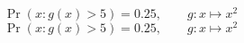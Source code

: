 \documentclass[nofonts]{ctexart}
\begin{document}
\[
	\Pr(x \colon g(x)>5) = 0.25,
	\qquad g \colon x \mapsto x^2
\]
\[
	\Pr(x : g(x)>5) = 0.25,
	\qquad g : x \mapsto x^2
\]
\end{document}
